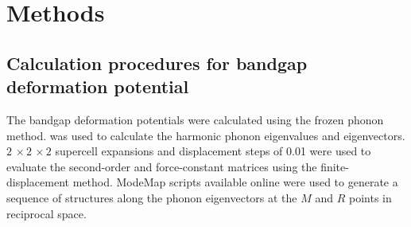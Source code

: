

\section{Methods}
\subsection{Calculation procedures for bandgap deformation potential}

The bandgap deformation potentials were calculated using the frozen phonon method.
\cite{} was used to calculate the harmonic phonon eigenvalues and eigenvectors. $2\,\times2\,\times2$ supercell expansions and displacement steps of 0.01 were used to evaluate the second-order and force-constant matrices using the finite-displacement method. ModeMap scripts available online\cite{} were used to generate a sequence of structures along the phonon eigenvectors at the $M$ and $R$ points in reciprocal space. 

